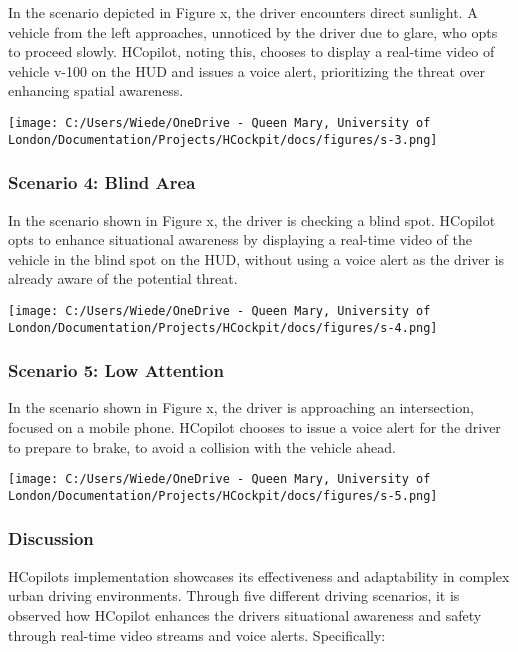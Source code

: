 \documentclass[
]{article}
\begin{document}
In the scenario depicted in Figure x, the driver encounters direct
sunlight. A vehicle from the left approaches, unnoticed by the driver
due to glare, who opts to proceed slowly. HCopilot, noting this, chooses
to display a real-time video of vehicle v-100 on the HUD and issues a
voice alert, prioritizing the threat over enhancing spatial awareness.

\texttt{[image: C:/Users/Wiede/OneDrive - Queen Mary, University of London/Documentation/Projects/HCockpit/docs/figures/s-3.png]}

\subsubsection{Scenario 4: Blind Area}\label{scenario-4-blind-area}

In the scenario shown in Figure x, the driver is checking a blind spot.
HCopilot opts to enhance situational awareness by displaying a real-time
video of the vehicle in the blind spot on the HUD, without using a voice
alert as the driver is already aware of the potential threat.

\texttt{[image: C:/Users/Wiede/OneDrive - Queen Mary, University of London/Documentation/Projects/HCockpit/docs/figures/s-4.png]}

\subsubsection{Scenario 5: Low
Attention}\label{scenario-5-low-attention}

In the scenario shown in Figure x, the driver is approaching an
intersection, focused on a mobile phone. HCopilot chooses to issue a
voice alert for the driver to prepare to brake, to avoid a collision
with the vehicle ahead.

\texttt{[image: C:/Users/Wiede/OneDrive - Queen Mary, University of London/Documentation/Projects/HCockpit/docs/figures/s-5.png]}

\subsubsection{Discussion}\label{discussion}

HCopilot\textquotesingle s implementation showcases its effectiveness
and adaptability in complex urban driving environments. Through five
different driving scenarios, it is observed how HCopilot enhances the
driver\textquotesingle s situational awareness and safety through
real-time video streams and voice alerts. Specifically:
\end{document}
